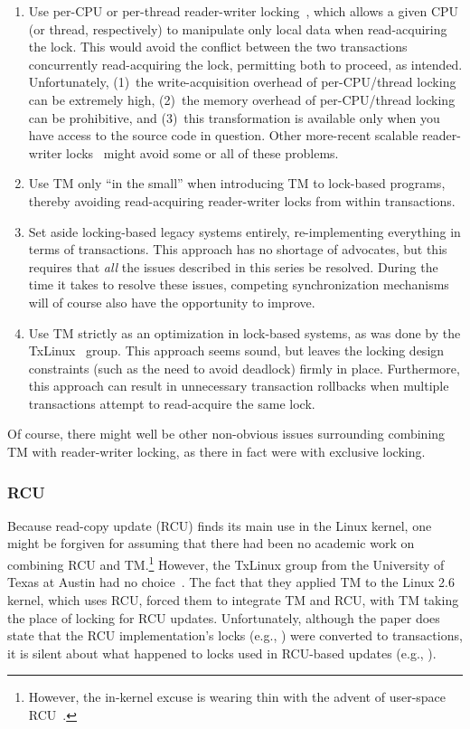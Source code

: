 \begin{enumerate}
\item	Use per-CPU or per-thread reader-writer
	locking~\cite{WilsonCHsieh92a}, which allows a
	given CPU (or thread, respectively) to manipulate only local
	data when read-acquiring the lock.
	This would avoid the conflict between the two transactions
	concurrently read-acquiring the lock, permitting both to proceed,
	as intended.
	Unfortunately, (1)~the write-acquisition overhead of
	per-CPU/thread locking can be extremely high, (2)~the memory
	overhead of per-CPU/thread locking can be prohibitive, and
	(3)~this transformation is available only when you have access to
	the source code in question.
	Other more-recent scalable
	reader-writer locks~\cite{YossiLev2009SNZIrwlock}
	might avoid some or all of these problems.
\item	Use TM only ``in the small'' when introducing TM to lock-based
	programs, thereby avoiding read-acquiring reader-writer locks
	from within transactions.
\item	Set aside locking-based legacy systems entirely, re-implementing
	everything in terms of transactions.
	This approach has no shortage of advocates, but this requires
	that \emph{all} the issues described in this series be resolved.
	During the time it takes to resolve these issues, competing
	synchronization mechanisms will of course also have the
	opportunity to improve.
\item	Use TM strictly as an optimization in lock-based systems, as was
	done by the TxLinux~\cite{ChistopherJRossbach2007a} group.
	This approach seems sound, but leaves the locking design
	constraints (such as the need to avoid deadlock) firmly in place.
	Furthermore, this approach can result in unnecessary transaction
	rollbacks when multiple transactions attempt to read-acquire
	the same lock.
\end{enumerate}

Of course, there might well be other non-obvious issues surrounding
combining TM with reader-writer locking, as there in fact were with
exclusive locking.

\subsubsection{RCU}
\label{sec:future:RCU}

Because read-copy update (RCU) finds its main use in the Linux kernel,
one might be forgiven for assuming that there had been no academic work
on combining RCU and TM.\footnote{
	However, the in-kernel excuse is wearing thin with the advent
	of user-space RCU~\cite{MathieuDesnoyers2009URCU,MathieuDesnoyers2012URCU}.}
However, the TxLinux group from the University of Texas at Austin had
no choice~\cite{ChistopherJRossbach2007a}.
The fact that they applied TM to the Linux 2.6 kernel, which uses RCU,
forced them to integrate TM and RCU, with TM taking the place of locking
for RCU updates.
Unfortunately, although the paper does state that the RCU implementation's
locks (e.g., ) were converted to transactions,
it is silent about what happened to locks used in RCU-based updates
(e.g., ).

